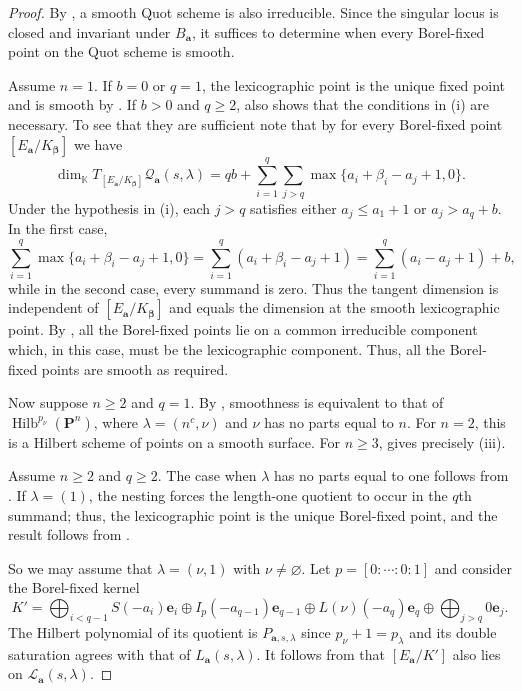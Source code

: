 \documentclass[leqno,11pt,a4paper]{amsart}
\theoremstyle{definition}
\numberwithin{equation}{section}
\newcommand{\kk}{\mathbb{K}}
\newcommand{\bfa}{\mathbf{a}}
\newcommand{\PP}{\mathbf{P}}
\newcommand{\bfe}{\mathbf{e}}
\newcommand{\LL}{\mathcal{L}}
\newcommand{\QQ}{\mathcal{Q}}
\DeclareMathOperator{\Hilb}{Hilb}
\begin{document}
\begin{proof}
By , a smooth Quot scheme is also irreducible. 
Since the singular locus is closed and invariant under $B_{\bfa}$, it suffices to determine when every Borel-fixed point on the Quot scheme is smooth. 

Assume $n=1$. If $b=0$ or $q=1$, the lexicographic point is the unique fixed point and is smooth by . 
If $b>0$ and $q\geq2$,  also shows that the conditions in (i) are necessary. 
To see that they are sufficient note that by  for every Borel-fixed point $[E_{\bfa}/K_{\boldsymbol\beta}]$ we have
$$
\dim_\kk T_{[E_{\bfa}/K_{\boldsymbol\beta}]}\QQ_{\bfa}(s,\lambda) = qb+\sum_{i=1}^q\sum_{j>q} \max\{a_i+\beta_i-a_j+1,0\}.
$$
Under the hypothesis in (i), each $j>q$ satisfies either $a_j\leq a_1+1$ or $a_j>a_q+b$. In the first case,
$$
\sum_{i=1}^q\max\{a_i+\beta_i-a_j+1,0\}
=\sum_{i=1}^q(a_i+\beta_i-a_j+1)
=\sum_{i=1}^q(a_i-a_j+1)+b,
$$
while in the second case, every summand is zero.
Thus the tangent dimension is independent of $[E_{\bfa}/K_{\boldsymbol\beta}]$ and equals the dimension at the smooth lexicographic point.
By , all the Borel-fixed points lie on a common irreducible component which, in this case, must be the lexicographic component. 
Thus, all the Borel-fixed points are smooth as required.


Now suppose $n\geq2$ and $q=1$. By , smoothness is equivalent to that of $\Hilb^{p_\nu}(\PP^n)$, where $\lambda=(n^c,\nu)$ and $\nu$ has no parts equal to $n$.
For $n=2$, this is a Hilbert scheme of points on a smooth surface.
For $n\geq3$, \cite[Theorem~A]{SS23} gives precisely (iii).

Assume $n\geq2$ and $q\geq2$.
The case when $\lambda$ has no parts equal to one follows from .
If $\lambda=(1)$, the nesting forces the length-one quotient to occur in the $q$th summand; thus, the lexicographic point is the unique Borel-fixed point, and the result follows from .

So we may assume that $\lambda=(\nu,1)$ with $\nu \ne \varnothing$.
Let $p=[0:\cdots:0:1]$ and consider the Borel-fixed kernel
$$
K'=\bigoplus_{i<q-1}S(-a_i)\bfe_i \oplus I_p(-a_{q-1})\bfe_{q-1} \oplus L(\nu)(-a_q)\bfe_q \oplus\bigoplus_{j>q}0\bfe_j.
$$
The Hilbert polynomial of its quotient is $P_{\bfa,s,\lambda}$ since $p_\nu+1=p_\lambda$ and its double saturation agrees with that of $L_{\bfa}(s,\lambda)$. 
It follows from   that $[E_{\bfa}/K']$ also lies on $\LL_{\bfa}(s,\lambda)$.




\end{proof}
\end{document}
